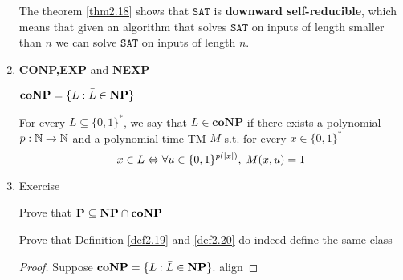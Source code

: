 \documentclass[11pt]{article}
\def \NP {\textbf{NP}}
\def \coNP {\textbf{coNP}}
\def \SAT {\text{SAT}}
\def \NP {\textbf{NP}}
\def \SAT {\texttt{SAT}}
\begin{document}
\begin{enumerate}
The theorem \ref{thm2.18} shows that \(\SAT\) is \textbf{downward self-reducible}, which means that
given an algorithm that solves \(\SAT\) on inputs of length smaller than \(n\) we can
solve \(\SAT\) on inputs of length \(n\).

\item \textbf{CONP,EXP} and \textbf{NEXP}
\label{sec:org3ddb97b}

\begin{definition}[]
\label{def2.19}
\(\coNP=\{L:\barL\in\NP\}\)
\end{definition}

\begin{definition}
\label{def2.20}
For every \(L\subseteq\{0,1\}^*\), we say that \(L\in\coNP\) if there exists a
polynomial \(p:\mathbb{N}\to\mathbb{N}\) and a polynomial-time TM \(M\) s.t. for every \(x\in\{0,1\}^*\)
     \begin{equation*}
x\in L \Leftrightarrow\forall u\in\{0,1\}^{p(\abs{x})},\; M(x,u)=1
     \end{equation*}
\end{definition}


\item Exercise
\label{sec:org1e37af4}
\begin{exercise}
\label{ex2.23}
Prove that \(\bP\subseteq\NP\cap\coNP\)
\end{exercise}

\begin{exercise}
\label{ex2.24}
Prove that Definition \ref{def2.19} and \ref{def2.20} do indeed define the same class
\end{exercise}

\begin{proof}
Suppose \(\coNP=\{L:\barL\in\NP\}\).
align
\end{proof}
\end{enumerate}
\end{document}
